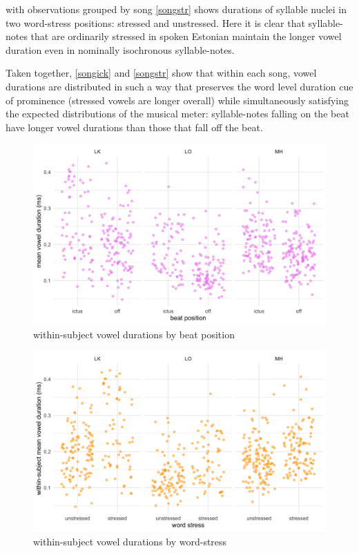 with observations grouped by song \ref{songstr} shows durations of syllable nuclei in two word-stress positions: stressed and unstressed. Here it is clear that syllable-notes that are ordinarily stressed in spoken Estonian maintain the longer vowel duration even in nominally isochronous syllable-notes. 

Taken together, \ref{songick} and \ref{songstr} show that within each song, vowel durations are distributed in such a way that preserves the word level duration cue of prominence (stressed vowels are longer overall) while simultaneously satisfying the expected distributions of the musical meter: syllable-notes falling on the beat have longer vowel durations than those that fall off the beat. 

\begin{figure}[htb]
\begin{center}
\includegraphics[width=\textwidth]{figures/perf_ick_dur.png}

\caption{within-subject vowel durations by beat position}
\label{perfick}
\end{center}
\end{figure}


\begin{figure}[htb]
\begin{center}
\includegraphics[width=\textwidth]{figures/perf_str_dur.png}


\caption{within-subject vowel durations by word-stress}
\label{perfstr}
\end{center}
\end{figure}

